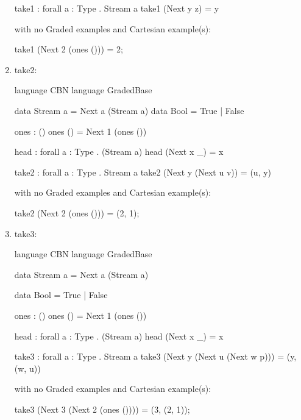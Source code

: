 \begin{enumerate}
\begin{granule}
take1 : forall { a : Type } . Stream a %
take1 (Next y z) = y
\end{granule}
with no Graded examples and Cartesian example(s):
\begin{granule}
take1 (Next 2 (ones ())) = 2;
\end{granule}
\item take2: 
\begin{granule}
language CBN 
language GradedBase 

data Stream a = Next a (Stream a) 
data Bool = True | False

ones : () %
ones () = Next 1 (ones ())

head : forall { a : Type } . (Stream a) %
head (Next x _) = x

take2 : forall { a : Type } . Stream a %
take2 (Next y (Next u v)) = (u, y)
\end{granule}
with no Graded examples and Cartesian example(s):
\begin{granule}
take2 (Next 2 (ones ())) = (2, 1);
\end{granule}
\item take3: 
\begin{granule}
language CBN 
language GradedBase 

data Stream a = Next a (Stream a) 

data Bool = True | False

ones : () %
ones () = Next 1 (ones ())

head : forall { a : Type } . (Stream a) %
head (Next x _) = x

take3 : forall { a : Type } . Stream a %
take3 (Next y (Next u (Next w p))) = (y, (w, u))
\end{granule}
with no Graded examples and Cartesian example(s):
\begin{granule}
take3 (Next 3 (Next 2 (ones ()))) = (3, (2, 1));
\end{granule}
\end{enumerate}
